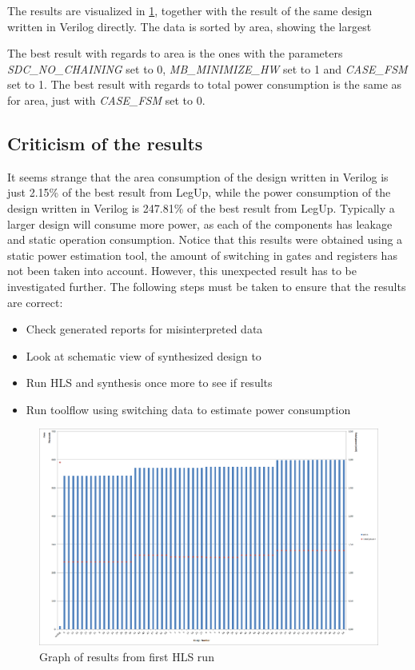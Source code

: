 The results are visualized in \cref{fig:resultgraphhlsrun1}, together with the result of the same design written in Verilog directly. The data is sorted by area, showing the largest 

The best result with regards to area is the ones with the parameters \textit{SDC\_NO\_CHAINING} set to 0, \textit{MB\_MINIMIZE\_HW} set to 1 and \textit{CASE\_FSM} set to 1. The best result with regards to total power consumption is the same as for area, just with \textit{CASE\_FSM} set to 0.

\subsection{Criticism of the results}
It seems strange that the area consumption of the design written in Verilog is just 2.15\% of the best result from LegUp, while the power consumption of the design written in Verilog is 247.81\% of the best result from LegUp. Typically a larger design will consume more power, as each of the components has leakage and static operation consumption. Notice that this results were obtained using a static power estimation tool, the amount of switching in gates and registers has not been taken into account. However, this unexpected result has to be investigated further. The following steps must be taken to ensure that the results are correct:

\begin{itemize}
    \item Check generated reports for misinterpreted data
    \item Look at schematic view of synthesized design to 
    \item Run HLS and synthesis once more to see if results 
    \item Run toolflow using switching data to estimate power consumption
\end{itemize}


\begin{figure}[hbpt]
\centering
\includegraphics[width=\textwidth]{../figs/resultGraph.png}
\caption{\label{fig:resultgraphhlsrun1}Graph of results from first HLS run}
\end{figure}

